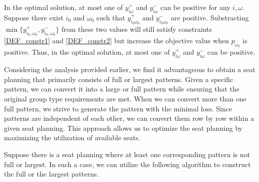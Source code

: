 

In the optimal solution, at most one of $y_{i \omega}^{+}$ and $y_{i \omega}^{-}$ can be positive for any $i, \omega$. Suppose there exist $i_0$ and $\omega_0$ such that $y_{i_0 \omega_0}^{+}$ and $y_{i_0 \omega_0}^{-}$ are positive. Substracting $\min\{y_{i_0, \omega_0}^{+}, y_{i_0, \omega_0}^{-}\}$ from these two values will still satisfy constraints \eqref{DEF_constr1} and \eqref{DEF_constr2} but increase the objective value when $p_{\omega_0}$ is positive. Thus, in the optimal solution, at most one of $y_{i \omega}^{+}$ and $y_{i \omega}^{-}$ can be positive.




Considering the analysis provided earlier, we find it advantageous to obtain a seat planning that primarily consists of full or largest patterns. Given a specific pattern, we can convert it into a large or full pattern while ensuring that the original group type requirements are met. When we can convert more than one full pattern, we strive to generate the pattern with the minimal loss. Since patterns are independent of each other, we can convert them row by row within a given seat planning. This approach allows us to optimize the seat planning by maximizing the utilization of available seats.


Suppose there is a seat planning where at least one corresponding pattern is not full or largest. In such a case, we can utilize the following algorithm to construct the full or the largest patterns.


